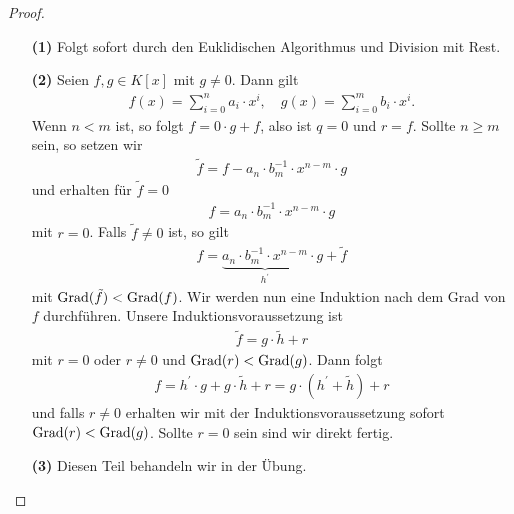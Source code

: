 \begin{proof} \
	\begin{enumerate}
		\item[\textbf{(1)}]
		Folgt sofort durch den Euklidischen Algorithmus und Division mit Rest.
		
		\item[\textbf{(2)}]
		Seien $ f,g \in K[x] $ mit $ g \neq 0 $. Dann gilt
		\begin{align*}
		f(x) = \sum \limits_{i=0}^n a_i \cdot x^i, \quad g(x) = \sum \limits_{i=0}^m b_i \cdot x^i.
		\end{align*}
		Wenn $ n < m $ ist, so folgt $ f = 0 \cdot g + f $, also ist $ q =0 $ und $ r = f $.
		Sollte $ n \geq m $ sein, so setzen wir
		\begin{align*}
		\tilde{f} = f - a_n\cdot b_m^{-1} \cdot x^{n-m} \cdot g
		\end{align*}
		und erhalten für $ \tilde{f}  = 0$
		\begin{align*}
		f = a_n \cdot b_m^{-1} \cdot x^{n-m} \cdot g
 		\end{align*}
 		mit $ r = 0 $.
 		Falls $ \tilde{f}  \neq 0$ ist, so gilt
 		\begin{align*}
 		f = \underbrace{a_n \cdot b_m^{-1} \cdot x^{n-m}}_{h^\prime}\cdot g + \tilde{f} 
 		\end{align*}
 		mit $ \operatorname{Grad}(\tilde{f}) < \operatorname{Grad} (f) $.
 		Wir werden nun eine Induktion nach dem Grad von $ f $ durchführen.
 		Unsere Induktionsvoraussetzung ist
 		\begin{align*}
 		\tilde{f} = g \cdot \tilde{h} + r 
 		\end{align*}
 		mit $ r = 0  $ oder $ r \neq 0 $ und $ \operatorname{Grad}(r) < \operatorname{Grad}(g) $.
 		Dann folgt
 		\begin{align*}
 		f = h^\prime \cdot g + g \cdot \tilde{h} + r = g \cdot ( h^\prime + \tilde{h}) + r
 		\end{align*}
 		und falls $ r \neq 0 $ erhalten wir mit der Induktionsvoraussetzung sofort 
 		$ \operatorname{Grad}(r) < \operatorname{Grad}(g) $. Sollte $ r = 0 $ sein sind wir direkt fertig.
		\item[\textbf{(3)}]  
		Diesen Teil behandeln wir in der Übung.
	\end{enumerate}
\end{proof}

